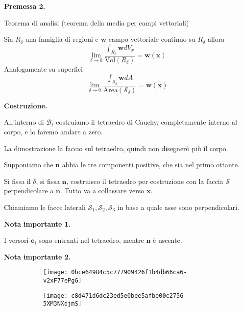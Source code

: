 \documentclass[10pt,a4paper,twoside]{book}
\begin{document}

\textbf{Premessa 2.}

Teorema di analisi (teorema della media per campi vettoriali)

Sia $R_{\delta }$ una famiglia di regioni e $\mathbf{w}$ campo vettoriale continuo su $R_{\delta }$ allora
\begin{equation*}
\lim _{\delta \rightarrow 0}\frac{\int _{R_{\delta }}\mathbf{w} dV_{x}}{\mathrm{Vol}( R_{\delta })} =\mathbf{w}(\mathbf{x})
\end{equation*}
Analogamente su superfici
\begin{equation*}
\lim _{\delta \rightarrow 0}\frac{\int _{\mathcal{S}_{\delta }}\mathbf{w} dA}{\mathrm{Area}(\mathcal{S}_{\delta })} =\mathbf{w}(\mathbf{x})
\end{equation*}


\textbf{Costruzione.}

All'interno di $\mathcal{B}_{t}$ costruiamo il tetraedro di Cauchy, completamente interno al corpo, e lo faremo andare a zero.


La dimostrazione la faccio sul tetraedro, quindi non disegnerò più il corpo.

Supponiamo che $\mathbf{n}$ abbia le tre componenti positive, che sia nel primo ottante.




Si fissa il $\delta $, si fissa $\mathbf{n}$, costruisco il tetraedro per costruzione con la faccia $\mathcal{S}$ perpendicolare a $\mathbf{n}$. Tutto va a collassare verso $\mathbf{x}$.

Chiamiamo le facce laterali $\mathcal{S}_{1} ,\mathcal{S}_{2} ,\mathcal{S}_{3}$ in base a quale asse sono perpendicolari.



\textbf{Nota importante 1.}

I versori $\mathbf{e}_{i}$ sono entranti nel tetraedro, mentre $\mathbf{n}$ è uscente.



\textbf{Nota importante 2.}

\begin{figure}[htpb]
     \centering
     \hfill
     \begin{subfigure}[b]{0.4\textwidth}
         \centering
         \texttt{[image: 0bce64984c5c777909426f1b4db66ca6-v2xF77ePgG]}
     \end{subfigure}
     \hfill
     \begin{subfigure}[b]{0.3\textwidth}
         \centering
         \texttt{[image: c8d471d6dc23ed5e0bee5afbe00c2756-5XM3NXdjmS]}
     \end{subfigure}
     \hfill
\end{figure}
\FloatBarrier
\end{document}
